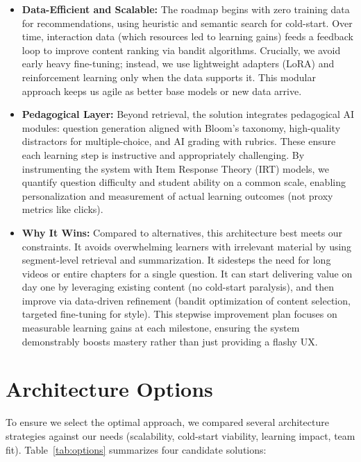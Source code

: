 \documentclass[11pt]{article}
\begin{document}
\begin{itemize}
    \item \textbf{Data-Efficient and Scalable:} The roadmap begins with zero training data for recommendations, using heuristic and semantic search for cold-start. Over time, interaction data (which resources led to learning gains) feeds a feedback loop to improve content ranking via bandit algorithms. Crucially, we avoid early heavy fine-tuning; instead, we use lightweight adapters (LoRA) and reinforcement learning only when the data supports it. This modular approach keeps us agile as better base models or new data arrive.
    \item \textbf{Pedagogical Layer:} Beyond retrieval, the solution integrates pedagogical AI modules: question generation aligned with Bloom’s taxonomy, high-quality distractors for multiple-choice, and AI grading with rubrics. These ensure each learning step is instructive and appropriately challenging. By instrumenting the system with Item Response Theory (IRT) models, we quantify question difficulty and student ability on a common scale, enabling personalization and measurement of actual learning outcomes (not proxy metrics like clicks).
    \item \textbf{Why It Wins:} Compared to alternatives, this architecture best meets our constraints. It avoids overwhelming learners with irrelevant material by using segment-level retrieval and summarization. It sidesteps the need for long videos or entire chapters for a single question. It can start delivering value on day one by leveraging existing content (no cold-start paralysis), and then improve via data-driven refinement (bandit optimization of content selection, targeted fine-tuning for style). This stepwise improvement plan focuses on measurable learning gains at each milestone, ensuring the system demonstrably boosts mastery rather than just providing a flashy UX.
\end{itemize}

\section{Architecture Options}
To ensure we select the optimal approach, we compared several architecture strategies against our needs (scalability, cold-start viability, learning impact, team fit). Table~\ref{tab:options} summarizes four candidate solutions:
\end{document}

